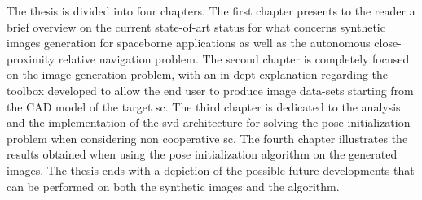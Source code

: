 The thesis is divided into four chapters. The first chapter presents to the reader a brief overview on the current state-of-art status for what concerns synthetic images generation for spaceborne applications as well as the autonomous close-proximity relative navigation problem. The second chapter is completely focused on the image generation problem, with an in-dept explanation regarding the toolbox developed to allow the end user to produce image data-sets starting from the CAD model of the target \acrshort{sc}. The third chapter is dedicated to the analysis and the implementation of the \acrshort{svd} architecture for solving the pose initialization problem when considering non cooperative \acrshort{sc}. The fourth chapter illustrates the results obtained when using the pose initialization algorithm on the generated images. The thesis ends with a depiction of the possible future developments that can be performed on both the synthetic images and the algorithm.